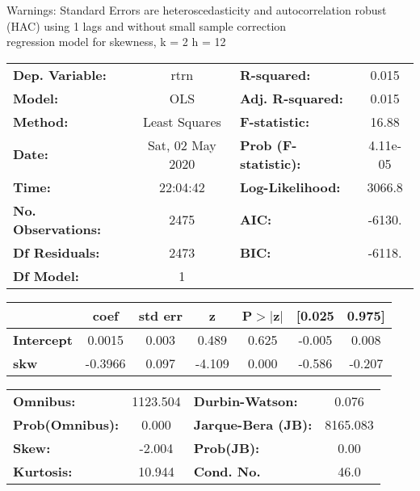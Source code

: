 Warnings: \newline
 [1] Standard Errors are heteroscedasticity and autocorrelation robust (HAC) using 1 lags and without small sample correction\\ 

regression model for skewness, k = 2 h = 12\begin{center}
\begin{tabular}{lclc}
\toprule
\textbf{Dep. Variable:}    &       rtrn       & \textbf{  R-squared:         } &     0.015   \\
\textbf{Model:}            &       OLS        & \textbf{  Adj. R-squared:    } &     0.015   \\
\textbf{Method:}           &  Least Squares   & \textbf{  F-statistic:       } &     16.88   \\
\textbf{Date:}             & Sat, 02 May 2020 & \textbf{  Prob (F-statistic):} &  4.11e-05   \\
\textbf{Time:}             &     22:04:42     & \textbf{  Log-Likelihood:    } &    3066.8   \\
\textbf{No. Observations:} &        2475      & \textbf{  AIC:               } &    -6130.   \\
\textbf{Df Residuals:}     &        2473      & \textbf{  BIC:               } &    -6118.   \\
\textbf{Df Model:}         &           1      & \textbf{                     } &             \\
\bottomrule
\end{tabular}
\begin{tabular}{lcccccc}
                   & \textbf{coef} & \textbf{std err} & \textbf{z} & \textbf{P$> |$z$|$} & \textbf{[0.025} & \textbf{0.975]}  \\
\midrule
\textbf{Intercept} &       0.0015  &        0.003     &     0.489  &         0.625        &       -0.005    &        0.008     \\
\textbf{skw}       &      -0.3966  &        0.097     &    -4.109  &         0.000        &       -0.586    &       -0.207     \\
\bottomrule
\end{tabular}
\begin{tabular}{lclc}
\textbf{Omnibus:}       & 1123.504 & \textbf{  Durbin-Watson:     } &    0.076  \\
\textbf{Prob(Omnibus):} &   0.000  & \textbf{  Jarque-Bera (JB):  } & 8165.083  \\
\textbf{Skew:}          &  -2.004  & \textbf{  Prob(JB):          } &     0.00  \\
\textbf{Kurtosis:}      &  10.944  & \textbf{  Cond. No.          } &     46.0  \\
\bottomrule
\end{tabular}
\end{center}

